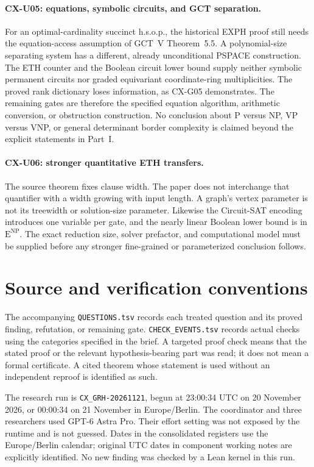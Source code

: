 \paragraph{CX-U05: equations, symbolic circuits, and GCT separation.}
For an optimal-cardinality succinct h.s.o.p., the historical EXPH
proof still needs the equation-access assumption of GCT~V
Theorem~5.5. A polynomial-size separating system has a different,
already unconditional PSPACE construction. The ETH counter and the
Boolean circuit lower bound supply neither symbolic permanent
circuits nor graded equivariant coordinate-ring multiplicities.
The proved rank dictionary loses information, as CX-G05 demonstrates.
The remaining gates are therefore the specified equation algorithm,
arithmetic conversion, or obstruction construction. No conclusion
about P versus NP, VP versus VNP, or general determinant border
complexity is claimed beyond the explicit statements in Part~I.

\paragraph{CX-U06: stronger quantitative ETH transfers.}
The source theorem fixes clause width. The paper does not interchange
that quantifier with a width growing with input length. A graph's
vertex parameter is not its treewidth or solution-size parameter.
Likewise the Circuit-SAT encoding introduces one variable per gate,
and the nearly linear Boolean lower bound is in
$\mathrm E^{\mathrm{NP}}$. The exact reduction size, solver prefactor,
and computational model must be supplied before any stronger
fine-grained or parameterized conclusion follows.

\section{Source and verification conventions}
\label{sec:source-conventions}

The accompanying \texttt{QUESTIONS.tsv} records each treated question
and its proved finding, refutation, or remaining gate.
\texttt{CHECK\_EVENTS.tsv} records actual checks using the categories
specified in the brief. A targeted proof check means that the stated
proof or the relevant hypothesis-bearing part was read; it does not
mean a formal certificate. A cited theorem whose statement is used
without an independent reproof is identified as such.

The research run is \texttt{CX\_GRH-20261121}, begun at
23:00:34 UTC on 20 November 2026, or 00:00:34 on 21 November in
Europe/Berlin. The coordinator and three researchers used
GPT-6 Astra Pro. Their effort setting was not exposed by the runtime
and is not guessed. Dates in the consolidated registers use the
Europe/Berlin calendar; original UTC dates in component working notes
are explicitly identified. No new finding was checked by a Lean
kernel in this run.

